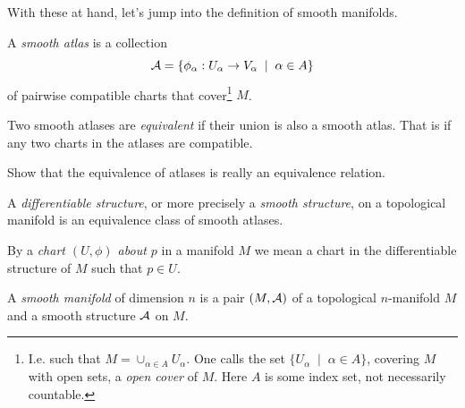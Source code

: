 With these at hand, let's jump into the definition of smooth manifolds.

\begin{definition}\label{def:cratlas}
  A \emph{smooth atlas} is a collection
  \begin{equation}
    \mathcal{A} = \{\phi_\alpha: U_\alpha \to V_\alpha \;\mid\; \alpha\in A\}
  \end{equation}
  of pairwise compatible charts that cover\footnote{I.e. such that $M = \cup_{\alpha\in A} U_\alpha$. One calls the set $\{U_\alpha \;\mid\; \alpha\in A\}$, covering $M$ with open sets, a \emph{open cover} of $M$. Here $A$ is some index set, not necessarily countable.} $M$.

  Two smooth atlases are \emph{equivalent} if their union is also a smooth atlas. That is if any two charts in the atlases are compatible.
\end{definition}

\begin{exercise}
  Show that the equivalence of atlases is really an equivalence relation.
\end{exercise}

\begin{definition}\label{def:diffstr}
  A \emph{differentiable structure}, or more precisely a \emph{smooth structure}, on a topological manifold is an equivalence class of smooth atlases.
\end{definition}

\begin{notation}
By a \emph{chart $(U, \phi)$ about $p$} in a manifold $M$ we mean a chart in the differentiable structure of $M$ such that $p\in U$.
\end{notation}

\begin{definition}\label{def:diffmanifold}
  A \emph{smooth manifold} of dimension $n$ is a pair $(M, \mathcal{A})$ of a topological $n$-manifold $M$ and a smooth structure $\mathcal{A}$ on $M$.
\end{definition}

